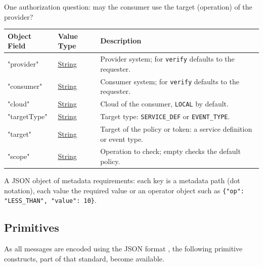 \documentclass[a4paper]{arrowhead}
\newcommand{\pref}[1]{{\textcolor{ArrowheadGrey}{\hyperref[sec:model:primitives:#1]{#1}}}}
\begin{document}
One authorization question: may the consumer use the target (operation) of the provider?


\noindent\begin{tabularx}{\textwidth}{| >{\raggedright\arraybackslash}p{3.9cm} | >{\raggedright\arraybackslash\small}p{5.3cm} | X |} \hline
\rowcolor{gray!33} Object Field & Value Type & Description \\ \hline
"provider" & \pref{String} & Provider system; for \texttt{verify} defaults to the requester. \\ \hline
"consumer" & \pref{String} & Consumer system; for \texttt{verify} defaults to the requester. \\ \hline
"cloud" & \pref{String} & Cloud of the consumer, \texttt{LOCAL} by default. \\ \hline
"target\allowbreak{}Type" & \pref{String} & Target type: \texttt{SERVICE\_\allowbreak{}DEF} or \texttt{EVENT\_\allowbreak{}TYPE}. \\ \hline
"target" & \pref{String} & Target of the policy or token: a service definition or event type. \\ \hline
"scope" & \pref{String} & Operation to check; empty checks the default policy. \\ \hline
\end{tabularx}




A JSON object of metadata requirements: each key is a metadata path (dot notation), each value the required value or an operator object such as \texttt{\{"op": "LESS\_\allowbreak{}THAN",\allowbreak{} "value": 10\}}.



\subsection{Primitives}
\label{sec:model:primitives}

As all messages are encoded using the JSON format \cite{rfc8259}, the following primitive constructs, part of that standard, become available.
\end{document}
